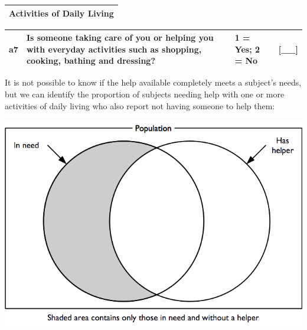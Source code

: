 \documentclass[12pt,a4paper]{book}
\theoremstyle{definition}
\theoremstyle{definition}
\theoremstyle{definition}
\theoremstyle{remark}
\begin{document}
\begin{longtable}[]{@{}c@{}}
\toprule
\begin{minipage}[t]{0.97\columnwidth}\centering
\textbf{Activities of Daily Living}\strut
\end{minipage}\tabularnewline
\bottomrule
\end{longtable}

\begin{longtable}[]{@{}llll@{}}
\toprule
\begin{minipage}[t]{0.09\columnwidth}\raggedright
a7\strut
\end{minipage} & \begin{minipage}[t]{0.41\columnwidth}\raggedright
Is someone taking care of you or helping you with everyday activities
such as shopping, cooking, bathing and dressing?\strut
\end{minipage} & \begin{minipage}[t]{0.25\columnwidth}\raggedright
1 = Yes; 2 = No\strut
\end{minipage} & \begin{minipage}[t]{0.13\columnwidth}\raggedright
{[}\_\_{]}\strut
\end{minipage}\tabularnewline
\bottomrule
\end{longtable}

It is not possible to know if the help available completely meets a
subject's needs, but we can identify the proportion of subjects needing
help with one or more activities of daily living who also report not
having someone to help them:

\begin{center}\includegraphics{figures/indicators17} \end{center}
\end{document}
